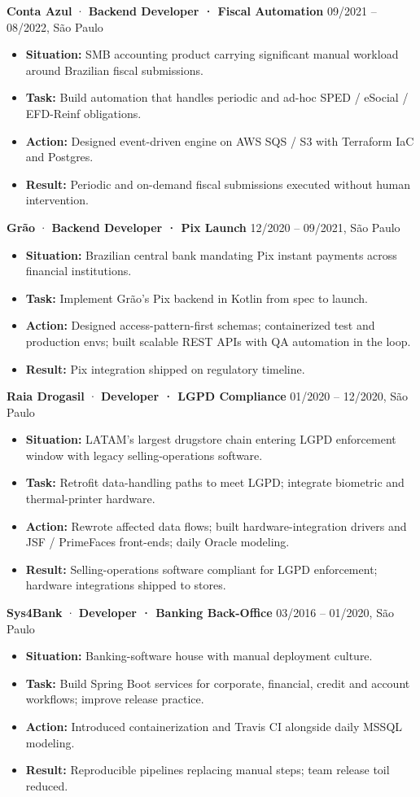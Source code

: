 \documentclass[10pt,a4paper]{article}
\newcommand{\engagement}[3]{\noindent\textbf{#1} \textcolor{accent}{·} \textbf{#2} \hfill \textcolor{muted}{#3}\par\smallskip}
\begin{document}
\engagement{Conta Azul}{Backend Developer · Fiscal Automation}{09/2021 -- 08/2022, São Paulo}
\begin{itemize}
\item \textbf{Situation:} SMB accounting product carrying significant manual workload around Brazilian fiscal submissions.
\item \textbf{Task:} Build automation that handles periodic and ad-hoc SPED / eSocial / EFD-Reinf obligations.
\item \textbf{Action:} Designed event-driven engine on AWS SQS / S3 with Terraform IaC and Postgres.
\item \textbf{Result:} Periodic and on-demand fiscal submissions executed without human intervention.
\end{itemize}\medskip

\engagement{Grão}{Backend Developer · Pix Launch}{12/2020 -- 09/2021, São Paulo}
\begin{itemize}
\item \textbf{Situation:} Brazilian central bank mandating Pix instant payments across financial institutions.
\item \textbf{Task:} Implement Grão's Pix backend in Kotlin from spec to launch.
\item \textbf{Action:} Designed access-pattern-first schemas; containerized test and production envs; built scalable REST APIs with QA automation in the loop.
\item \textbf{Result:} Pix integration shipped on regulatory timeline.
\end{itemize}\medskip

\engagement{Raia Drogasil}{Developer · LGPD Compliance}{01/2020 -- 12/2020, São Paulo}
\begin{itemize}
\item \textbf{Situation:} LATAM's largest drugstore chain entering LGPD enforcement window with legacy selling-operations software.
\item \textbf{Task:} Retrofit data-handling paths to meet LGPD; integrate biometric and thermal-printer hardware.
\item \textbf{Action:} Rewrote affected data flows; built hardware-integration drivers and JSF / PrimeFaces front-ends; daily Oracle modeling.
\item \textbf{Result:} Selling-operations software compliant for LGPD enforcement; hardware integrations shipped to stores.
\end{itemize}\medskip

\engagement{Sys4Bank}{Developer · Banking Back-Office}{03/2016 -- 01/2020, São Paulo}
\begin{itemize}
\item \textbf{Situation:} Banking-software house with manual deployment culture.
\item \textbf{Task:} Build Spring Boot services for corporate, financial, credit and account workflows; improve release practice.
\item \textbf{Action:} Introduced containerization and Travis CI alongside daily MSSQL modeling.
\item \textbf{Result:} Reproducible pipelines replacing manual steps; team release toil reduced.
\end{itemize}
\end{document}
